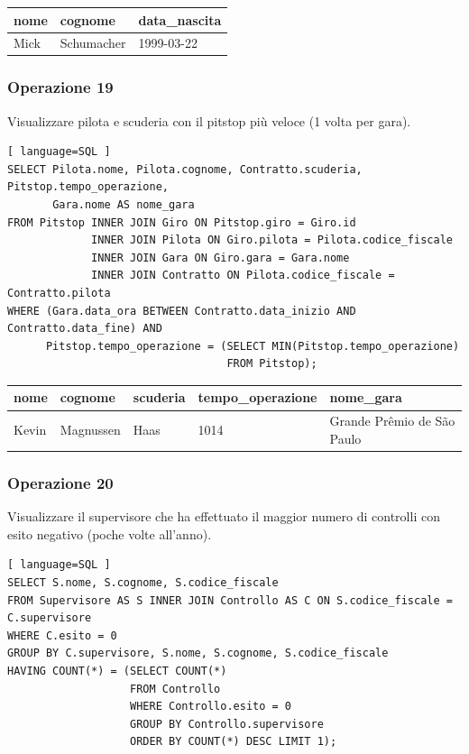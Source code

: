 \documentclass[11pt]{article}
\begin{document}
\begin{table}[!ht]
    \centering
    \begin{tabular}{|l|l|l|}
    \hline
        \textbf{nome} & \textbf{cognome} & \textbf{data\_nascita} \\ \hline
        Mick & Schumacher & 1999-03-22 \\ \hline
    \end{tabular}
\end{table}


\subsubsection{Operazione 19}
Visualizzare pilota e scuderia con il pitstop più veloce (1 volta per gara).
\begin{lstlisting}[ language=SQL ]
SELECT Pilota.nome, Pilota.cognome, Contratto.scuderia, Pitstop.tempo_operazione, 
       Gara.nome AS nome_gara
FROM Pitstop INNER JOIN Giro ON Pitstop.giro = Giro.id
             INNER JOIN Pilota ON Giro.pilota = Pilota.codice_fiscale
             INNER JOIN Gara ON Giro.gara = Gara.nome
             INNER JOIN Contratto ON Pilota.codice_fiscale = Contratto.pilota
WHERE (Gara.data_ora BETWEEN Contratto.data_inizio AND Contratto.data_fine) AND
      Pitstop.tempo_operazione = (SELECT MIN(Pitstop.tempo_operazione)
                                  FROM Pitstop);
\end{lstlisting}

\begin{table}[!ht]
    \centering
    \begin{tabular}{|l|l|l|l|l|}
    \hline
        \textbf{nome} & \textbf{cognome} & \textbf{scuderia} & \textbf{tempo\_operazione} & \textbf{nome\_gara} \\ \hline
        Kevin & Magnussen & Haas & 1014 & Grande Prêmio de São Paulo \\ \hline
    \end{tabular}
\end{table}


\subsubsection{Operazione 20}
Visualizzare il supervisore che ha effettuato il maggior numero di controlli con esito negativo (poche volte all'anno).
\begin{lstlisting}[ language=SQL ]
SELECT S.nome, S.cognome, S.codice_fiscale
FROM Supervisore AS S INNER JOIN Controllo AS C ON S.codice_fiscale = C.supervisore
WHERE C.esito = 0
GROUP BY C.supervisore, S.nome, S.cognome, S.codice_fiscale
HAVING COUNT(*) = (SELECT COUNT(*)
                   FROM Controllo
                   WHERE Controllo.esito = 0
                   GROUP BY Controllo.supervisore
                   ORDER BY COUNT(*) DESC LIMIT 1);
\end{lstlisting}
\end{document}
